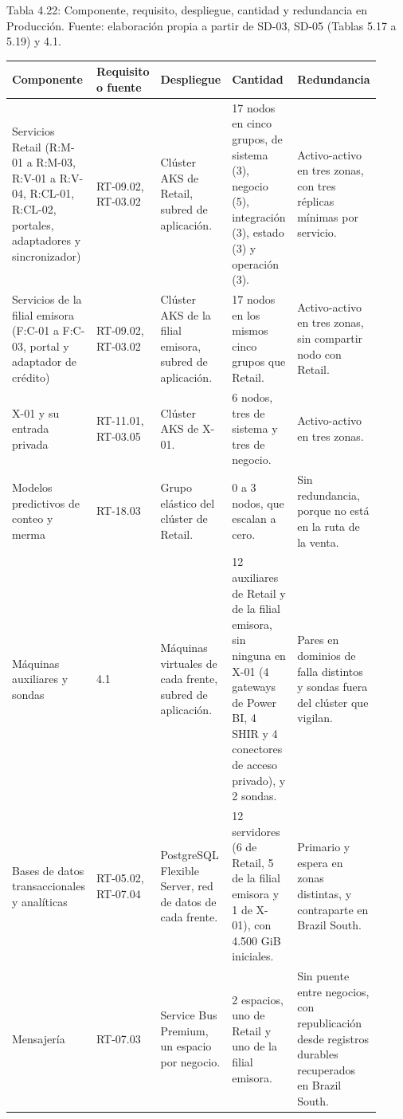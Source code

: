\documentclass[11pt]{article}
\begin{document}
Tabla 4.22: Componente, requisito, despliegue, cantidad y redundancia en Producción. Fuente: elaboración propia a partir de SD-03, SD-05 (Tablas 5.17 a 5.19) y 4.1.\par\nopagebreak
\begin{longtable}{@{}p{0.20\linewidth}p{0.09\linewidth}p{0.20\linewidth}p{0.25\linewidth}p{0.18\linewidth}@{}}
\toprule Componente & Requisito o fuente & Despliegue & Cantidad & Redundancia \\
\midrule\endhead\bottomrule\endlastfoot
Servicios Retail (R:M-01 a R:M-03, R:V-01 a R:V-04, R:CL-01, R:CL-02, portales, adaptadores y sincronizador) & RT-09.02, RT-03.02 & Clúster AKS de Retail, subred de aplicación. & 17 nodos en cinco grupos, de sistema (3), negocio (5), integración (3), estado (3) y operación (3). & Activo-activo en tres zonas, con tres réplicas mínimas por servicio. \\
Servicios de la filial emisora (F:C-01 a F:C-03, portal y adaptador de crédito) & RT-09.02, RT-03.02 & Clúster AKS de la filial emisora, subred de aplicación. & 17 nodos en los mismos cinco grupos que Retail. & Activo-activo en tres zonas, sin compartir nodo con Retail. \\
X-01 y su entrada privada & RT-11.01, RT-03.05 & Clúster AKS de X-01. & 6 nodos, tres de sistema y tres de negocio. & Activo-activo en tres zonas. \\
Modelos predictivos de conteo y merma & RT-18.03 & Grupo elástico del clúster de Retail. & 0 a 3 nodos, que escalan a cero. & Sin redundancia, porque no está en la ruta de la venta. \\
Máquinas auxiliares y sondas & 4.1 & Máquinas virtuales de cada frente, subred de aplicación. & 12 auxiliares de Retail y de la filial emisora, sin ninguna en X-01 (4 gateways de Power BI, 4 SHIR y 4 conectores de acceso privado), y 2 sondas. & Pares en dominios de falla distintos y sondas fuera del clúster que vigilan. \\
Bases de datos transaccionales y analíticas & RT-05.02, RT-07.04 & PostgreSQL Flexible Server, red de datos de cada frente. & 12 servidores (6 de Retail, 5 de la filial emisora y 1 de X-01), con 4.500 GiB iniciales. & Primario y espera en zonas distintas, y contraparte en Brazil South. \\
Mensajería & RT-07.03 & Service Bus Premium, un espacio por negocio. & 2 espacios, uno de Retail y uno de la filial emisora. & Sin puente entre negocios, con republicación desde registros durables recuperados en Brazil South. \\

\end{longtable}
\end{document}
